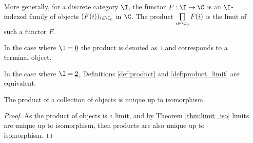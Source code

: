 \begin{definition}

	More generally, for a discrete category $\I$, the functor $F:\I\to \C$ is an
	$\I$-indexed family of objects $(F(i))_{i\in \I_0}$ in $\C$. The product
	$\prod\limits_{i\in \I_0} F(i)$ is the limit of such a functor $F$.
\end{definition}

\begin{remark}
	In the case where $\I=\underline{0}$ the product is denoted as $1$ and
	corresponds to a terminal object.
\end{remark}

\begin{remark}
	In the case where $\I=\underline{2}$, Definitions \ref{def:product} and
	\ref{def:product_limit} are equivalent.
\end{remark}

\begin{theorem}
	The product of a collection of objects is unique up to isomorphism.

	\begin{proof}
		As the product of objects is a limit, and by Theorem \ref{thm:limit_iso}
		limits are unique up to isomorphism, then products are also unique up to
		isomorphism.
	\end{proof}
\end{theorem}



